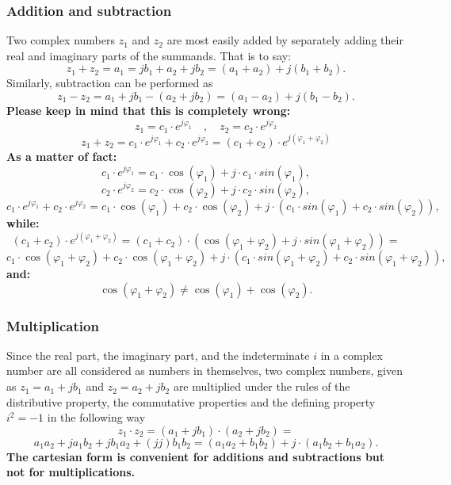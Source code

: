 \documentclass[12pt,oneside,openany]{memoir}
\numberwithin{equation}{subsection}
\begin{document}
\subsubsection{Addition and subtraction}
Two complex numbers \(z_1\) and \(z_2\) are most easily added by separately adding their real and imaginary parts of the summands. That is to say:
\[
	z_1 + z_2 = a_1 = jb_1 + a_2 + jb_2 = (a_1 + a_2) + j(b_1 + b_2).
\]
Similarly, subtraction can be performed as
\[
	z_1 - z_2 = a_1 + jb_1 - (a_2 + jb_2) = (a_1 - a_2) +j(b_1 - b_2).
\]
\textbf{Please keep in mind that this is completely wrong:}
\[
	z_1 = c_1 \cdot e^{j \varphi_1} \quad , \quad z_2 = c_2 \cdot e^{j \varphi_2}
\]
\[
	z_1 + z_2 = c_1 \cdot e^{j \varphi_1} + c_2 \cdot e^{j \varphi_2} = (c_1 + c_2) \cdot e^{j(\varphi_1 + \varphi_2)}
\]
\textbf{As a matter of fact:}
\[
	c_1 \cdot e^{j \varphi_1} = c_1 \cdot \cos(\varphi_1) + j \cdot c_1 \cdot sin(\varphi_1),
\]
\[
	c_2 \cdot e^{j \varphi_2} = c_2 \cdot \cos(\varphi_2) + j \cdot c_2 \cdot sin(\varphi_2),
\]
\[
	c_1 \cdot e^{j \varphi_1} + c_2 \cdot e^{j \varphi_2} = c_1 \cdot \cos(\varphi_1) + c_2 \cdot \cos(\varphi_2) + j \cdot (c_1 \cdot sin(\varphi_1) + c_2 \cdot sin(\varphi_2)),
\]
\textbf{while:}
\[
	(c_1 + c_2) \cdot e^{j (\varphi_1 + \varphi_2)} = (c_1 + c_2) \cdot (\cos(\varphi_1 + \varphi_2) + j \cdot sin(\varphi_1 + \varphi_2)) =
\]
\[
	c_1 \cdot \cos(\varphi_1 + \varphi_2) + c_2 \cdot \cos(\varphi_1 + \varphi_2) + j \cdot (c_1 \cdot sin(\varphi_1 + \varphi_2) + c_2 \cdot sin(\varphi_1 + \varphi_2)),
\]
\textbf{and:}
\[
	\cos(\varphi_1 + \varphi_2) \neq \cos(\varphi_1) + \cos(\varphi_2).
\]

\subsubsection{Multiplication}
Since the real part, the imaginary part, and the indeterminate \(i\) in a complex number are all considered as numbers in themselves, two complex numbers, given as \(z_1 = a_1 + j b_1\) and \(z_2 = a_2 + j b_2\) are multiplied under the rules of the distributive property, the commutative properties and the defining property \(i^{2} = -1\) in the following way
\[
	z_1 \cdot z_2 = (a_1 + j b_1) \cdot (a_2 + j b_2) =
\]
\[
	a_1 a_2 + j a_1 b_2 + j b_1 a_2 + (jj) b_1 b_2 = (a_1 a_2 + b_1 b_2) + j \cdot (a_1 b_2 + b_1 a_2).
\]
\textbf{The cartesian form is convenient for additions and subtractions but not for multiplications.}
\end{document}

